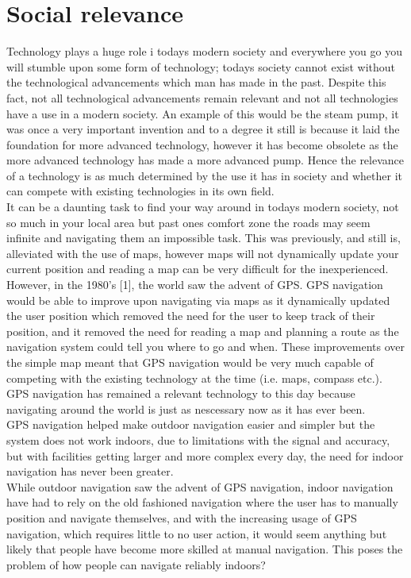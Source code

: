 \section{Social relevance}
Technology plays a huge role i todays modern society and everywhere you go you will stumble upon some form of technology; todays society cannot exist without the technological advancements which man has made in the past.
Despite this fact, not all technological advancements remain relevant and not all technologies have a use in a modern society. An example of this would be the steam pump, it was once a very important invention and to a degree it still is because it laid the foundation for more advanced technology, however it has become obsolete as the more advanced technology has made a more advanced pump. Hence the relevance of a technology is as much determined by the use it has in society and whether it can compete with existing technologies in its own field. \\
It can be a daunting task to find your way around in todays modern society, not so much in your local area but past ones comfort zone the roads may seem infinite and navigating them an impossible task. This was previously, and still is, alleviated with the use of maps, however maps will not dynamically update your current position and reading a map can be very difficult for the inexperienced. However, in the 1980's [1], the world saw the advent of GPS. GPS navigation would be able to improve upon navigating via maps as it dynamically updated the user position which removed the need for the user to keep track of their position, and it removed the need for reading a map and planning a route as the navigation system could tell you where to go and when. These improvements over the simple map meant that GPS navigation would be very much capable of competing with the existing technology at the time (i.e. maps, compass etc.). GPS navigation has remained a relevant technology to this day because navigating around the world is just as nescessary now as it has ever been. \\
GPS navigation helped make outdoor navigation easier and simpler but the system does not work indoors, due to limitations with the signal and accuracy, but with facilities getting larger and more complex every day, the need for indoor navigation has never been greater. \\
While outdoor navigation saw the advent of GPS navigation, indoor navigation have had to rely on the old fashioned navigation where the user has to manually position and navigate themselves, and with the increasing usage of GPS navigation, which requires little to no user action, it would seem anything but likely that people have become more skilled at manual navigation. This poses the problem of how people can navigate reliably indoors? \\
